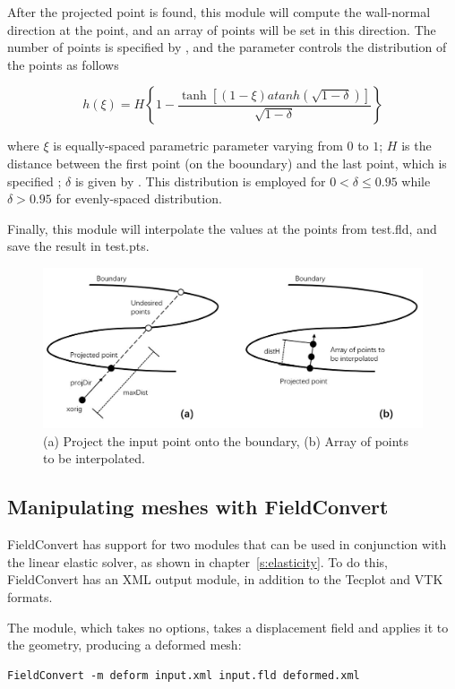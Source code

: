 After the projected point is found, this module will compute the wall-normal 
direction at the point, and an array of points will be set in this direction.
The number of points is specified by , and the parameter 
 controls the distribution of the points as follows

\[
h(\xi) = H \left\{1-\frac{\tanh \left[(1-\xi) atanh(\sqrt{1-\delta}) \right]}{\sqrt{1-\delta}} \right\}
\]

where $\xi$ is equally-spaced parametric parameter varying from $0$ to $1$; 
$H$ is the distance between the first point (on the booundary) and the last 
point, which is specified ; $\delta$ is given by . This 
distribution is employed for $0 < \delta \le 0.95$ while $\delta > 0.95$ for 
evenly-spaced distribution.

Finally, this module will interpolate the values at the points from test.fld, 
and save the result in test.pts.
%
\begin{figure}[!htbp]
  \begin{center}
    \includegraphics[width = 0.9 \textwidth]{img/module_wallNormalData.jpg}
    \caption{(a) Project the input point onto the boundary, (b) Array of 
    points to be interpolated.}
  \end{center}
\end{figure}
%
%
%

\subsection{Manipulating meshes with FieldConvert}
FieldConvert has support for two modules that can be used in conjunction with
the linear elastic solver, as shown in chapter~\ref{s:elasticity}. To do this,
FieldConvert has an XML output module, in addition to the Tecplot and VTK
formats.

The  module, which takes no options, takes a displacement field
and applies it to the geometry, producing a deformed mesh:
\begin{lstlisting}[style=BashInputStyle]
FieldConvert -m deform input.xml input.fld deformed.xml
\end{lstlisting}

